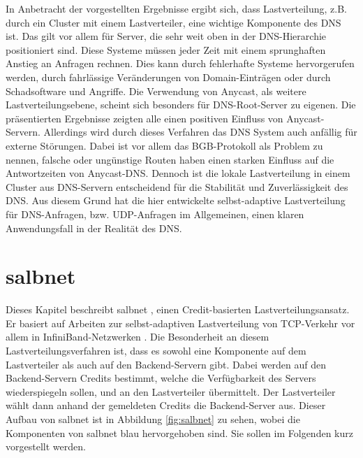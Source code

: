 \documentclass[a4paper, 12pt, BCOR10mm, DIV12, toc=bibliography, toc=listof, german]{scrbook}
\begin{document}
	In Anbetracht der vorgestellten Ergebnisse ergibt sich, dass Lastverteilung, z.B. durch ein
	Cluster mit einem Lastverteiler, eine wichtige Komponente des DNS ist. Das gilt vor allem für
	Server, die sehr weit oben in der DNS-Hierarchie positioniert sind. Diese Systeme müssen jeder Zeit mit einem
	sprunghaften Anstieg an Anfragen rechnen. Dies kann durch fehlerhafte Systeme hervorgerufen werden,
	durch fahrlässige Veränderungen von Domain-Einträgen oder durch Schadsoftware und Angriffe. Die
	Verwendung von Anycast, als weitere Lastverteilungsebene, scheint sich besonders für
	DNS-Root-Server zu eigenen. Die präsentierten Ergebnisse zeigten alle einen positiven Einfluss von
	Anycast-Servern. Allerdings wird durch dieses Verfahren das DNS System auch anfällig für externe
	Störungen. Dabei ist vor allem das BGB-Protokoll als Problem zu nennen, falsche oder ungünstige
	Routen haben einen starken Einfluss auf die Antwortzeiten von Anycast-DNS. Dennoch ist die lokale
	Lastverteilung in einem Cluster aus DNS-Servern entscheidend für die Stabilität und Zuverlässigkeit
	des DNS. Aus diesem Grund hat die hier entwickelte selbst-adaptive Lastverteilung für DNS-Anfragen, bzw.
	UDP-Anfragen im Allgemeinen, einen klaren Anwendungsfall in der Realität des DNS.


	\chapter{salbnet} %
	\label{cha:salbnet}

		Dieses Kapitel beschreibt salbnet \cite{salbnet}, einen Credit-basierten
		Lastverteilungsansatz.  Er basiert auf Arbeiten zur selbst-adaptiven Lastverteilung von
		TCP-Verkehr vor allem in InfiniBand-Netzwerken \cite{zinke2007, scsczile2008,
		schneidenbach2009}. Die Besonderheit an diesem Lastverteilungsverfahren ist, dass es sowohl eine
		Komponente auf dem Lastverteiler als auch auf den Backend-Servern gibt. Dabei werden auf den
		Backend-Servern Credits bestimmt, welche die Verfügbarkeit des Servers wiederspiegeln sollen,
		und an den Lastverteiler übermittelt. Der Lastverteiler wählt dann anhand der gemeldeten
		Credits die Backend-Server aus. Dieser Aufbau von salbnet ist in Abbildung \ref{fig:salbnet} zu
		sehen, wobei die Komponenten von salbnet blau hervorgehoben sind. Sie sollen im Folgenden kurz
		vorgestellt werden.
\end{document}
